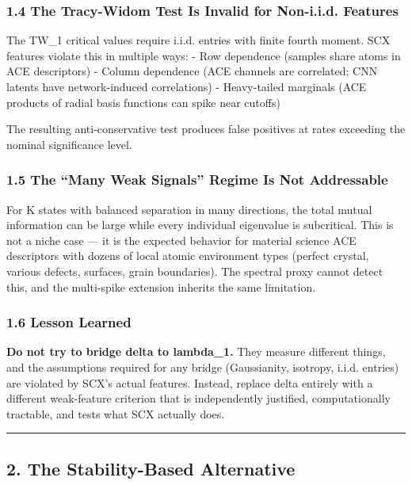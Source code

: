 \documentclass[
  12pt,
]{article}
\begin{document}
\subsubsection{1.4 The Tracy-Widom Test Is Invalid for Non-i.i.d.
Features}\label{the-tracy-widom-test-is-invalid-for-non-i.i.d.-features}

The TW\_1 critical values require i.i.d. entries with finite fourth
moment. SCX features violate this in multiple ways: - Row dependence
(samples share atoms in ACE descriptors) - Column dependence (ACE
channels are correlated; CNN latents have network-induced correlations)
- Heavy-tailed marginals (ACE products of radial basis functions can
spike near cutoffs)

The resulting anti-conservative test produces false positives at rates
exceeding the nominal significance level.

\subsubsection{1.5 The ``Many Weak Signals'' Regime Is Not
Addressable}\label{the-many-weak-signals-regime-is-not-addressable}

For K states with balanced separation in many directions, the total
mutual information can be large while every individual eigenvalue is
subcritical. This is not a niche case --- it is the expected behavior
for material science ACE descriptors with dozens of local atomic
environment types (perfect crystal, various defects, surfaces, grain
boundaries). The spectral proxy cannot detect this, and the multi-spike
extension inherits the same limitation.

\subsubsection{1.6 Lesson Learned}\label{lesson-learned}

\textbf{Do not try to bridge delta to lambda\_1.} They measure different
things, and the assumptions required for any bridge (Gaussianity,
isotropy, i.i.d. entries) are violated by SCX's actual features.
Instead, replace delta entirely with a different weak-feature criterion
that is independently justified, computationally tractable, and tests
what SCX actually does.

\begin{center}\rule{0.5\linewidth}{0.5pt}\end{center}

\subsection{2. The Stability-Based
Alternative}\label{the-stability-based-alternative}
\end{document}
